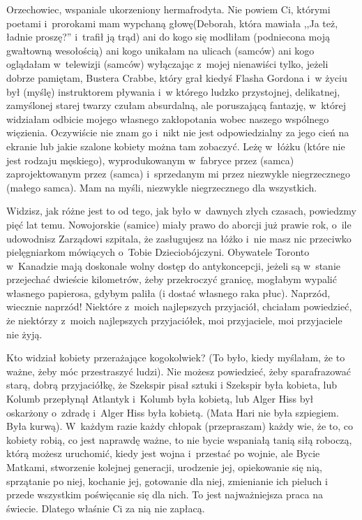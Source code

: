 \documentclass[oneside,polish,12pt,sfheadings]{mwbk}
\begin{document}
Orzechowiec, wspaniale ukorzeniony hermafrodyta. Nie powiem Ci, którymi
poetami i~prorokami mam wypchaną głowę(Deborah, która mawiała ,,Ja
też, ładnie proszę?'' i~trafił ją trąd) ani do kogo się modliłam (podniecona
moją gwałtowną wesołością) ani kogo unikałam na ulicach (samców) ani
kogo oglądałam w~telewizji (samców) wyłączając z~mojej nienawiści
tylko, jeżeli dobrze pamiętam, Bustera Crabbe, który grał kiedyś Flasha
Gordona i~w życiu był (myślę) instruktorem pływania i~w którego ludzko
przystojnej, delikatnej, zamyślonej starej twarzy czułam absurdalną,
ale poruszającą fantazję, w~której widziałam odbicie mojego własnego
zakłopotania wobec naszego wspólnego więzienia. Oczywiście nie znam
go i~nikt nie jest odpowiedzialny za jego cień na ekranie lub jakie
szalone kobiety można tam zobaczyć. Leżę w~łóżku (które nie jest rodzaju
męskiego), wyprodukowanym w~fabryce przez (samca) zaprojektowanym
przez (samca) i~sprzedanym mi przez niezwykle niegrzecznego (małego
samca). Mam na myśli, niezwykle niegrzecznego dla wszystkich.

Widzisz, jak różne jest to od tego, jak było w~dawnych złych czasach,
powiedzmy pięć lat temu. Nowojorskie (samice) miały prawo do aborcji
już prawie rok, o~ile udowodnisz Zarządowi szpitala, że zasługujesz
na łóżko i~nie masz nic przeciwko pielęgniarkom mówiących o~Tobie
Dzieciobójczyni. Obywatele Toronto w~Kanadzie mają doskonale wolny
dostęp do antykoncepcji, jeżeli są w~stanie przejechać dwieście kilometrów,
żeby przekroczyć granicę, mogłabym wypalić własnego papierosa, gdybym
paliła (i dostać własnego raka płuc). Naprzód, wiecznie naprzód! Niektóre
z~moich najlepszych przyjaciół, chciałam powiedzieć, że niektórzy
z~moich najlepszych przyjaciółek, moi przyjaciele, moi przyjaciele
nie żyją.

Kto widział kobiety przerażające kogokolwiek? (To było, kiedy myślałam,
że to ważne, żeby móc przestraszyć ludzi). Nie możesz powiedzieć,
żeby sparafrazować starą, dobrą przyjaciółkę, że Szekspir pisał sztuki
i Szekspir była kobieta, lub Kolumb przepłynął Atlantyk i~Kolumb była
kobietą, lub Alger Hiss był oskarżony o~zdradę i~Alger Hiss była kobietą.
(Mata Hari nie była szpiegiem. Była kurwą). W~każdym razie każdy chłopak
(przepraszam) każdy wie, że to, co kobiety robią, co jest naprawdę
ważne, to nie bycie wspaniałą tanią siłą roboczą, którą możesz uruchomić,
kiedy jest wojna i~przestać po wojnie, ale Bycie Matkami, stworzenie
kolejnej generacji, urodzenie jej, opiekowanie się nią, sprzątanie
po niej, kochanie jej, gotowanie dla niej, zmienianie ich pieluch
i przede wszystkim poświęcanie się dla nich. To jest najważniejsza
praca na świecie. Dlatego właśnie Ci za nią nie zapłacą.
\end{document}

